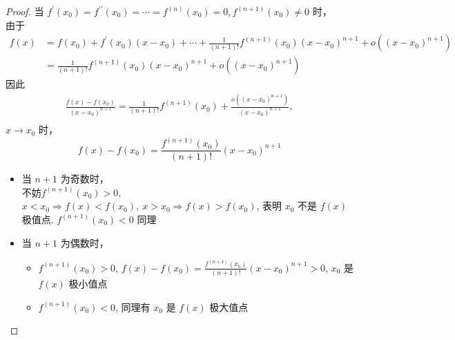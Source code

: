 \documentclass{article}
\newcommand{\ds}{^\prime}
\begin{document}
\begin{proof}
    当 $f\ds(x_0) = f^{\prime\prime}(x_0) = \cdots = f^{(n)}(x_0) = 0, f^{(n + 1)}(x_0) \neq 0$ 时，\\
    由于
    \begin{align*}
        f(x) & = f(x_0) + f\ds(x_0)(x - x_0) + \cdots + \frac{1}{(n + 1)!}f^{(n + 1)}(x_0)(x - x_0)^{n + 1} + o((x - x_0)^{n + 1}) \\
        & = \frac{1}{(n + 1)!}f^{(n + 1)}(x_0)(x - x_0)^{n + 1} + o((x - x_0)^{n + 1})
    \end{align*} 
    因此 
    \begin{align*}
        \frac{f(x) - f(x_0)}{(x - x_0)^{n + 1}} = \frac{1}{(n + 1)!}f^{(n + 1)}(x_0) + \frac{o((x - x_0)^{n + 1})}{(x - x_0)^{n + 1}}, \\
    \end{align*}
    $x \to x_0$ 时，
    \[
        f(x) - f(x_0) = \frac{f^{(n + 1)}(x_0)}{(n + 1)!}(x - x_0)^{n + 1}
    \]
    \begin{itemize}
        \item 当 $n + 1$ 为奇数时，\\
        不妨$f^{(n + 1)}(x_0) > 0$, $x < x_0 \Rightarrow f(x) < f(x_0), \ x > x_0 \Rightarrow f(x) > f(x_0)$, 表明 $x_0$ 不是 $f(x)$ 极值点. $f^{(n + 1)}(x_0) < 0$ 同理
        \item 当 $n + 1$ 为偶数时，
        \begin{itemize}
            \item $f^{(n + 1)}(x_0) > 0$, $f(x) - f(x_0) = \frac{f^{(n + 1)}(x_0)}{(n + 1)!}(x - x_0)^{n + 1} > 0$, $x_0$ 是 $f(x)$ 极小值点
            \item $f^{(n + 1)}(x_0) < 0$, 同理有 $x_0$ 是 $f(x)$ 极大值点
        \end{itemize}
    \end{itemize}
\end{proof}
\end{document}
